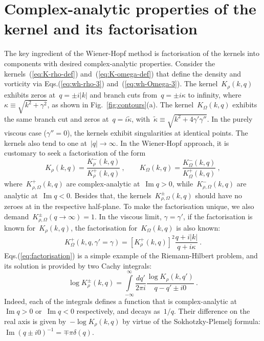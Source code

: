 \documentclass[preprint,aps,eqsecnum, prb]{revtex4-1}
\newcommand{\fplus}[1]{{#1}^{+}}
\newcommand{\fminus}[1]{{#1}^{-}}
\newcommand{\fplusminus}[1]{{#1}^{\pm}}
\renewcommand{\Im}{\mathop{\mathrm{Im}}\nolimits}
\begin{document}
\section{Complex-analytic properties of the kernel and its factorisation}
\label{sec:factorisation}
The key ingredient of the Wiener-Hopf method is factorisation of the kernels
into components with desired complex-analytic properties.
Consider the kernels~(\ref{eq:K-rho-def}) and~(\ref{eq:K-omega-def})
that define the density and vorticity via Eqs.(\ref{eq:wh-rho-3})
and~(\ref{eq:wh-Omega-3}).
The  kernel~$K_\rho(k, q)$ exhibits zeros at~$q = \pm i |k|$ and branch cuts
from~$q = \pm i \kappa$ to infinity, where~$\kappa \equiv \sqrt{k^2 + \gamma^2}$, 
as shown in Fig.~\ref{fig:contours}(a). 
The kernel~$K_\Omega(k, q)$ exhibits the same branch cut
and zeros at~$q = i \tilde{\kappa}$,
with~${\tilde\kappa} \equiv \sqrt{k^2 + 4 \gamma'\gamma''} $.
In the purely viscous case ($\gamma'' = 0$), the kernels exhibit
singularities at identical points.
The kernels also
tend to one at~$|q| \to \infty$. In the Wiener-Hopf approach, it is
customary to seek a factorisation of the form
\begin{equation}
  \label{eq:factorisation}
  K_\rho(k, q) = \frac{\fminus{K}_\rho(k, q)}{\fplus{K}_\rho(k, q)}
  \ ,
  \qquad
  K_\Omega(k, q) = \frac{\fminus{K}_\Omega(k, q)}{\fplus{K}_\Omega(k, q)}
  \ ,
\end{equation}
where~$\fplus{K}_{\rho, \Omega}(k, q)$ are complex-analytic at~$\Im q > 0$,
while~$\fminus{K}_{\rho, \Omega}(k, q)$ are analytic at~$\Im q < 0$.
Besides that, the kernels~$\fplusminus{K}_{\rho, \Omega}(k, q)$ should have no
zeroes at in the respective half-plane.
To make the factorisation unique, we also
demand~$\fplusminus{K}_{\rho, \Omega}(q\to \infty) = 1$.
In the viscous limit, $\gamma = \gamma'$,
if the factorisation is known for~$K_\rho(k, q)$,
 the factorisation for~$K_\Omega(k, q)$ is also known:
\begin{equation}
  \fplus{K}_\Omega(k, q, \gamma'=\gamma) = \left[\fplus{K}_\rho(k, q)\right]^2
                              \frac{q + i|k|}{q + i\kappa}
  \ .
\end{equation}
Eqs.(\ref{eq:factorisation})  is  a simple example of
the Riemann-Hilbert problem, and its solution is provided by two Cachy integrals:
\begin{equation}
  \label{eq:factor-cauchy}
  \log\fplusminus{K}_\rho(k, q)
  = \int\limits_{-\infty}^{\infty} \frac{dq'}{2\pi i}
    \frac{\log K_\rho(k, q') }{q - q' \pm i0}
  \ .
\end{equation}
Indeed, each of the integrals defines a function that is complex-analytic
at~\mbox{$\Im q > 0$} or~\mbox{$\Im q < 0$} respectively,
and decays as~$1/q$.
Their difference on the real axis is given by~$-\log K_\rho(k, q)$ by virtue
of the Sokhotzky-Plemelj formula: $\Im (q \pm  i0)^{-1} = \mp\pi \delta(q)$.
\end{document}

